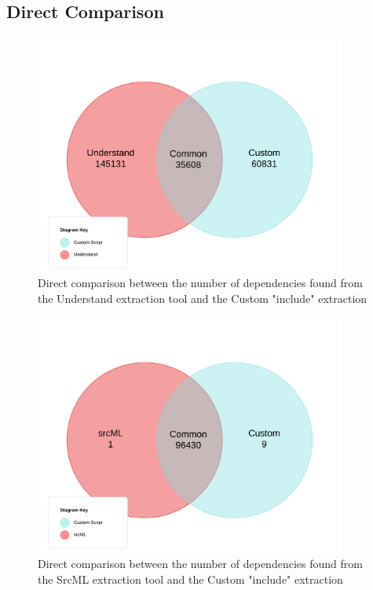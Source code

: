 \documentclass[12pt, dvipsnames, a4paper]{article}
\begin{document}
\subsection{Direct Comparison}

\begin{figure}[H]
	\center
	\includegraphics[width = 290pt]{assets/UnderstandCustom.jpeg}
	\caption{Direct comparison between the number of dependencies found from the Understand extraction tool and the Custom "include" extraction}
\end{figure}

\begin{figure}[H]
	\center
	\includegraphics[width = 290pt]{assets/SrcMLCustom.jpeg}
	\caption{Direct comparison between the number of dependencies found from the SrcML extraction tool and the Custom "include" extraction}
\end{figure}
\end{document}
